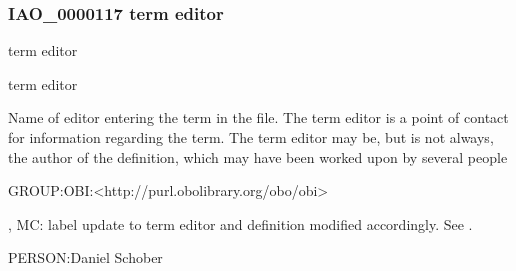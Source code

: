 \documentclass[letterpaper,10pt,english]{sphinxmanual}
\begin{document}
\subsubsection{IAO\_0000117 \sphinxhyphen{} term editor}
\label{\detokenize{doc-IAO_0000117:iao-0000117-term-editor}}\label{\detokenize{doc-IAO_0000117:index-0}}\label{\detokenize{doc-IAO_0000117::doc}}
\begin{sphinxShadowBox}

\sphinxAtStartPar
term editor
\end{sphinxShadowBox}

\begin{sphinxShadowBox}

\sphinxAtStartPar
term editor
\end{sphinxShadowBox}

\begin{sphinxShadowBox}

\sphinxAtStartPar
Name of editor entering the term in the file. The term editor is a point of contact for information regarding the term. The term editor may be, but is not always, the author of the definition, which may have been worked upon by several people
\end{sphinxShadowBox}

\begin{sphinxShadowBox}

\sphinxAtStartPar
GROUP:OBI:\textless{}http://purl.obolibrary.org/obo/obi\textgreater{}
\end{sphinxShadowBox}

\begin{sphinxShadowBox}

, MC: label update to term editor and definition modified accordingly. See .
\end{sphinxShadowBox}

\begin{sphinxShadowBox}

\sphinxAtStartPar
PERSON:Daniel Schober
\end{sphinxShadowBox}
\begin{quote}

\ignorespaces \end{quote}
\end{document}
